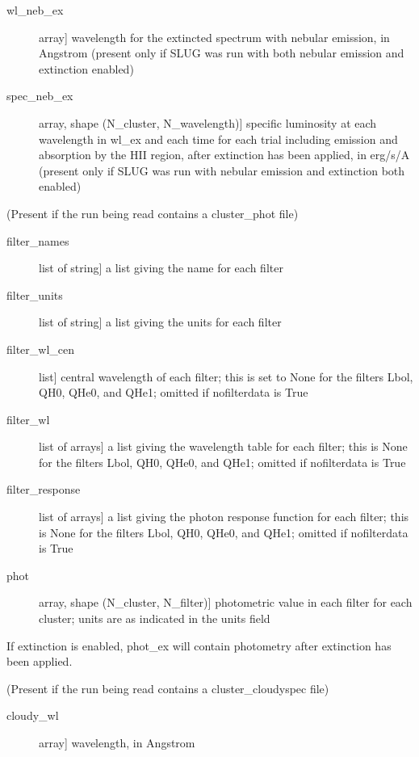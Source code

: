 \documentclass[letterpaper,10pt,english]{sphinxmanual}
\begin{document}
\begin{fulllineitems}
\begin{description}
\begin{description}
\item[{wl\_neb\_ex}] \leavevmode{[}array{]}
wavelength for the extincted spectrum with nebular emission,
in Angstrom (present only if SLUG was run with both nebular
emission and extinction enabled)

\item[{spec\_neb\_ex}] \leavevmode{[}array, shape (N\_cluster, N\_wavelength){]}
specific luminosity at each wavelength in wl\_ex and each
time for each trial including emission and absorption by the
HII region, after extinction has been applied, in erg/s/A
(present only if SLUG was run with nebular emission and
extinction both enabled)

\end{description}

(Present if the run being read contains a cluster\_phot file)
\begin{description}
\item[{filter\_names}] \leavevmode{[}list of string{]}
a list giving the name for each filter

\item[{filter\_units}] \leavevmode{[}list of string{]}
a list giving the units for each filter

\item[{filter\_wl\_cen}] \leavevmode{[}list{]}
central wavelength of each filter; this is set to None for the
filters Lbol, QH0, QHe0, and QHe1; omitted if nofilterdata is
True

\item[{filter\_wl}] \leavevmode{[}list of arrays{]}
a list giving the wavelength table for each filter; this is
None for the filters Lbol, QH0, QHe0, and QHe1; omitted if
nofilterdata is True

\item[{filter\_response}] \leavevmode{[}list of arrays{]}
a list giving the photon response function for each filter;
this is None for the filters Lbol, QH0, QHe0, and QHe1; omitted
if nofilterdata is True

\item[{phot}] \leavevmode{[}array, shape (N\_cluster, N\_filter){]}
photometric value in each filter for each cluster; units are as
indicated in the units field

\end{description}

If extinction is enabled, phot\_ex will contain photometry  
after extinction has been applied.

(Present if the run being read contains a cluster\_cloudyspec file)
\begin{description}
\item[{cloudy\_wl}] \leavevmode{[}array{]}
wavelength, in Angstrom


\end{description}
\end{description}
\end{fulllineitems}
\end{document}
